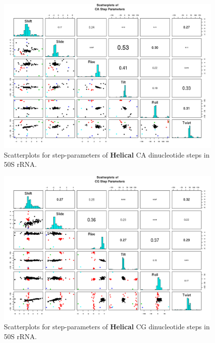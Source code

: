 \begin{figure}[H]
\centering
\includegraphics[angle=90, scale=0.6]{Helical/CA.png}
\caption{Scatterplots for step-parameters of \textbf{Helical} CA dinucleotide steps
in 50S rRNA.}
\label{fig:stepsCA}
\end{figure}

\begin{figure}[H]
\centering
\includegraphics[angle=90, scale=0.6]{Helical/CG.png}
\caption{Scatterplots for step-parameters of \textbf{Helical} CG dinucleotide steps
in 50S rRNA.}
\label{fig:stepsCG}
\end{figure}

